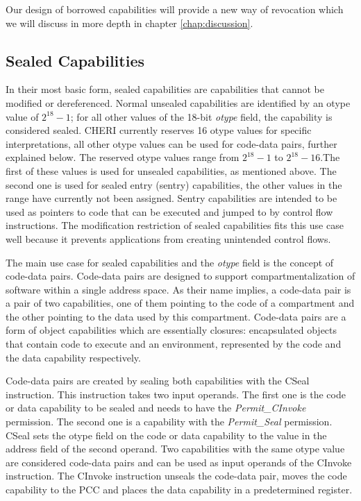 Our design of borrowed capabilities will provide a new way of revocation which we will discuss in more depth in chapter \ref{chap:discussion}.

\subsection{Sealed Capabilities}
\label{sec:sealed}
In their most basic form, sealed capabilities are capabilities that cannot be modified or dereferenced. Normal unsealed capabilities are identified by an otype value of $2^{18} - 1$; for all other values of the 18-bit \textit{otype} field, the capability is considered sealed. CHERI currently reserves 16 otype values for specific interpretations, all other otype values can be used for code-data pairs, further explained below. The reserved otype values range from $2^{18} - 1$ to $2^{18} - 16$.The first of these values is used for unsealed capabilities, as mentioned above. The second one is used for sealed entry (sentry) capabilities, the other values in the range have currently not been assigned. Sentry capabilities are intended to be used as pointers to code that can be executed and jumped to by control flow instructions. The modification restriction of sealed capabilities fits this use case well because it prevents applications from creating unintended control flows.

The main use case for sealed capabilities and the \textit{otype} field is the concept of code-data pairs. Code-data pairs are designed to support compartmentalization of software within a single address space. As their name implies, a code-data pair is a pair of two capabilities, one of them pointing to the code of a compartment and the other pointing to the data used by this compartment. Code-data pairs are a form of object capabilities which are essentially closures: encapsulated objects that contain code to execute and an environment, represented by the code and the data capability respectively.

Code-data pairs are created by sealing both capabilities with the CSeal instruction. This instruction takes two input operands. The first one is the code or data capability to be sealed and needs to have the \textit{Permit\_CInvoke} permission. The second one is a capability with the \textit{Permit\_Seal} permission. CSeal sets the otype field on the code or data capability to the value in the address field of the second operand. Two capabilities with the same otype value are considered code-data pairs and can be used as input operands of the CInvoke instruction. The CInvoke instruction unseals the code-data pair, moves the code capability to the PCC and places the data capability in a predetermined register.

